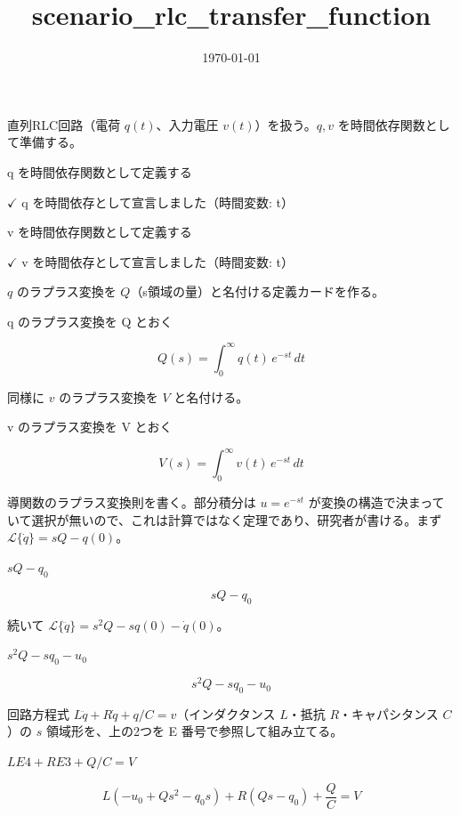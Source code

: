 \documentclass[dvipdfmx,a4paper,11pt]{jsarticle}
\title{scenario\_rlc\_transfer\_function}
\date{\today}
\begin{document}
\maketitle

直列RLC回路（電荷 $q(t)$、入力電圧 $v(t)$）を扱う。$q,v$ を時間依存関数として準備する。

q を時間依存関数として定義する

$\checkmark$ q を時間依存として宣言しました（時間変数: t）

v を時間依存関数として定義する

$\checkmark$ v を時間依存として宣言しました（時間変数: t）

$q$ のラプラス変換を $Q$（s領域の量）と名付ける定義カードを作る。

q のラプラス変換を Q とおく

\begin{equation}
  Q(s) = \int_0^{\infty} q(t)\, e^{-s t}\, dt
  \label{eq:E1}
\end{equation}

同様に $v$ のラプラス変換を $V$ と名付ける。

v のラプラス変換を V とおく

\begin{equation}
  V(s) = \int_0^{\infty} v(t)\, e^{-s t}\, dt
  \label{eq:E2}
\end{equation}

導関数のラプラス変換則を書く。部分積分は $u=e^{-st}$ が変換の構造で決まっていて選択が無いので、これは計算ではなく定理であり、研究者が書ける。まず $\mathcal L\{\dot q\} = sQ - q(0)$。

$s Q - q_0$

\begin{equation}
  s Q - q_0
  \label{eq:E3}
\end{equation}

続いて $\mathcal L\{\ddot q\} = s^2 Q - s q(0) - \dot q(0)$。

$s^2 Q - s q_0 - u_0$

\begin{equation}
  s^2 Q - s q_0 - u_0
  \label{eq:E4}
\end{equation}

回路方程式 $L\ddot q+R\dot q+q/C=v$（インダクタンス $L$・抵抗 $R$・キャパシタンス $C$）の $s$ 領域形を、上の2つを E 番号で参照して組み立てる。

$L E4 + R E3 + Q/C = V$

\begin{equation}
  L \left(-u_{0}+Q s^2-q_{0} s\right)+R \left(Q s-q_{0}\right)+\frac{Q}{C}=V
  \label{eq:E5}
\end{equation}
\end{document}
